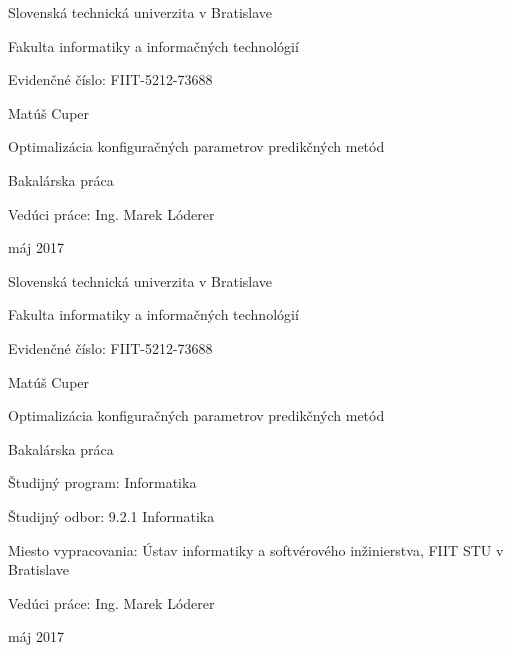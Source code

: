 \documentclass[a4paper,slovak,12pt,appendix]{article}
\begin{document}
\begin{titlepage}
	\centering
	{\Large Slovenská technická univerzita v Bratislave \par}
	{\Large Fakulta informatiky a informačných technológií \par}
  \vspace{0.5cm}
  {\normalsize Evidenčné číslo: FIIT-5212-73688 \par}
	\vspace{7cm}
  {\large Matúš Cuper \par}
  \vspace{0.5cm}
	{\LARGE Optimalizácia konfiguračných parametrov predikčných metód \par}
	\vspace{0.5cm}
	{\large Bakalárska práca \par}
	\vspace{7cm}
  \flushleft
	{\large Vedúci práce: Ing. Marek Lóderer \par}
  \vspace{0.5cm}
  {\large máj 2017 \par}
	\vfill
\end{titlepage}

\begin{titlepage}
	\centering
  {\Large Slovenská technická univerzita v Bratislave \par}
	{\Large Fakulta informatiky a informačných technológií \par}
  \vspace{0.5cm}
  {\normalsize Evidenčné číslo: FIIT-5212-73688 \par}
	\vspace{7cm}
  {\large Matúš Cuper \par}
  \vspace{0.5cm}
	{\LARGE Optimalizácia konfiguračných parametrov predikčných metód \par}
	\vspace{0.5cm}
	{\large Bakalárska práca \\}
	\vspace{7cm}
  \flushleft
  {\normalsize Študijný program: Informatika \par}
	{\normalsize Študijný odbor: 9.2.1 Informatika \par}
	{\normalsize Miesto vypracovania: Ústav informatiky a softvérového inžinierstva, FIIT STU v Bratislave \par}
	{\normalsize Vedúci práce: Ing. Marek Lóderer \par}
  \vspace{0.5cm}
  {\normalsize máj 2017 \par}
\end{titlepage}
\end{document}

